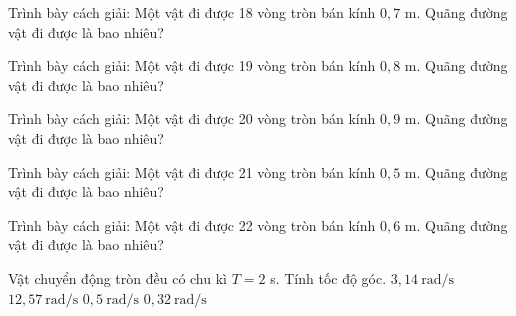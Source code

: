 \begin{bt}
Trình bày cách giải: Một vật đi được 18 vòng tròn bán kính $0,7$ m. Quãng đường vật đi được là bao nhiêu?
\end{bt}

\begin{bt}
Trình bày cách giải: Một vật đi được 19 vòng tròn bán kính $0,8$ m. Quãng đường vật đi được là bao nhiêu?
\end{bt}

\begin{bt}
Trình bày cách giải: Một vật đi được 20 vòng tròn bán kính $0,9$ m. Quãng đường vật đi được là bao nhiêu?
\end{bt}

\begin{bt}
Trình bày cách giải: Một vật đi được 21 vòng tròn bán kính $0,5$ m. Quãng đường vật đi được là bao nhiêu?
\end{bt}

\begin{bt}
Trình bày cách giải: Một vật đi được 22 vòng tròn bán kính $0,6$ m. Quãng đường vật đi được là bao nhiêu?
\end{bt}

\begin{ex}
Vật chuyển động tròn đều có chu kì $T=2$ s. Tính tốc độ góc.
\choice
{\True $3,14\ \mathrm{rad/s}$}
{$12,57\ \mathrm{rad/s}$}
{$0,5\ \mathrm{rad/s}$}
{$0,32\ \mathrm{rad/s}$}
\end{ex}

